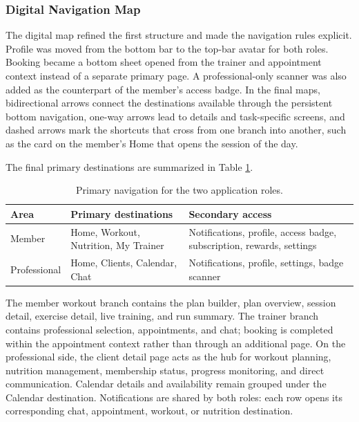 \subsubsection{Digital Navigation Map}\label{subsubsect:DigitalNavigationMap}

The digital map refined the first structure and made the navigation rules explicit. Profile was moved from the bottom bar to the top-bar avatar for both roles. Booking became a bottom sheet opened from the trainer and appointment context instead of a separate primary page. A professional-only scanner was also added as the counterpart of the member's access badge. In the final maps, bidirectional arrows connect the destinations available through the persistent bottom navigation, one-way arrows lead to details and task-specific screens, and dashed arrows mark the shortcuts that cross from one branch into another, such as the card on the member's Home that opens the session of the day.

The final primary destinations are summarized in Table \ref{tab:roleNavigation}.

\begin{table}[H]
    \centering
    \begin{tabularx}{\textwidth}{l >{\raggedright\arraybackslash}X >{\raggedright\arraybackslash}X}
        \toprule
        \textbf{Area} & \textbf{Primary destinations} & \textbf{Secondary access} \\
        \midrule
        Member & Home, Workout, Nutrition, My Trainer & Notifications, profile, access badge, subscription, rewards, settings \\
        Professional & Home, Clients, Calendar, Chat & Notifications, profile, settings, badge scanner \\
        \bottomrule
    \end{tabularx}
    \caption{Primary navigation for the two application roles.}
    \label{tab:roleNavigation}
\end{table}

The member workout branch contains the plan builder, plan overview, session detail, exercise detail, live training, and run summary. The trainer branch contains professional selection, appointments, and chat; booking is completed within the appointment context rather than through an additional page. On the professional side, the client detail page acts as the hub for workout planning, nutrition management, membership status, progress monitoring, and direct communication. Calendar details and availability remain grouped under the Calendar destination. Notifications are shared by both roles: each row opens its corresponding chat, appointment, workout, or nutrition destination.

